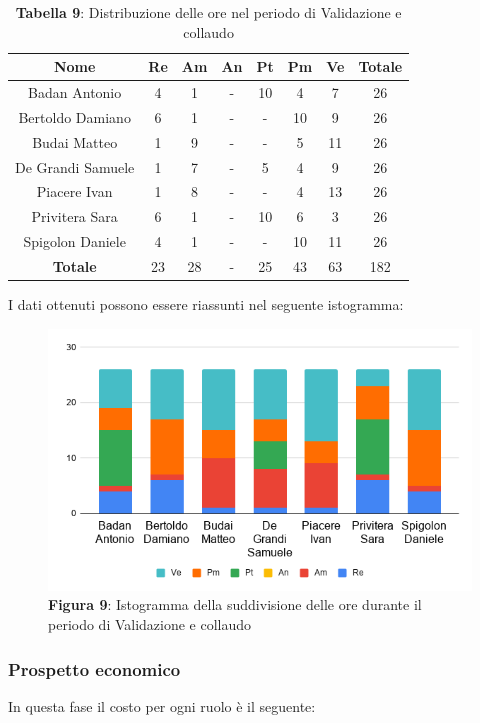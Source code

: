 \begin{table}[H]
	\centering
	\renewcommand{\arraystretch}{1.5}
	\begin{tabular}{|c|c|c|c|c|c|c|c|}
		\hline
		\rowcolor{lighter-grayer}
Nome & Re & Am & An & Pt & Pm & Ve & Totale \\ \hline
Badan Antonio & 4 & 1 & - & 10 & 4 & 7 & 26 \\ \hline
Bertoldo Damiano & 6 & 1 & - & - & 10 & 9 & 26 \\ \hline
Budai Matteo & 1 & 9 & - & - & 5 & 11 & 26 \\ \hline
De Grandi Samuele & 1 & 7 & - & 5 & 4 & 9 & 26 \\ \hline
Piacere Ivan & 1 & 8 & - & - & 4 & 13 & 26 \\ \hline
Privitera Sara & 6 & 1 & - & 10 & 6 & 3 & 26 \\ \hline
Spigolon Daniele & 4 & 1 & - & - & 10 & 11 & 26 \\ \hline
\textbf{Totale} & 23 & 28 & - & 25 & 43 & 63 & 182 \\ \hline
	\end{tabular}
	\caption*{\textbf{Tabella 9}: Distribuzione delle ore nel periodo di Validazione e collaudo\\}
\end{table}	
	I dati ottenuti possono essere riassunti nel seguente istogramma:

\begin{figure}[H]
	\centering
	\includegraphics[width=0.7\linewidth]{res/images/IstogrammaFase4.png}
	\caption*{\textbf{Figura 9}: Istogramma della suddivisione delle ore durante il periodo di Validazione e collaudo}
	\label{fig:Figura10}
\end{figure}
	
	
\subsubsection{Prospetto economico}
In questa fase il costo per ogni ruolo è il seguente:

